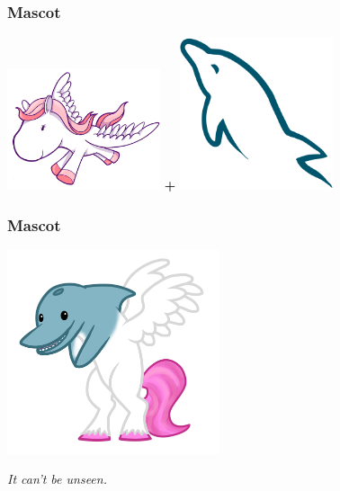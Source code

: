 \documentclass{beamer}
\begin{document}
\begin{frame}[fragile]\frametitle{Mascot}

    \begin{center}
        \includegraphics[width=4.5cm]{django-pony}
        \Huge{\textbf{+}}
        \includegraphics[width=4.5cm]{mysql-dolphin}
    \end{center}

\end{frame}



\begin{frame}[fragile]\frametitle{Mascot}

    \begin{center}
        \includegraphics[height=6cm]{django-mysql-dolphin-pony}
    \end{center}

    \begin{center}
        \textit{It can't be unseen.}
    \end{center}

\end{frame}
\end{document}
